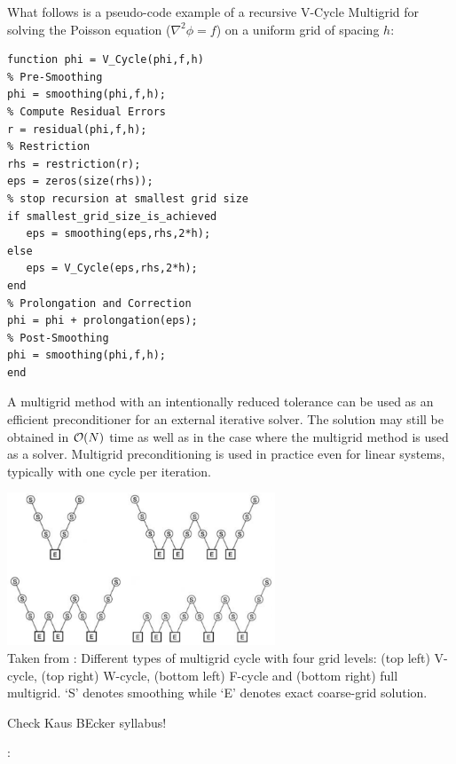 What follows is a pseudo-code example of a recursive V-Cycle Multigrid for solving 
the Poisson equation ($\nabla^2 \phi = f$) 
on a uniform grid of spacing $h$:

\begin{verbatim}
function phi = V_Cycle(phi,f,h)
% Pre-Smoothing
phi = smoothing(phi,f,h);
% Compute Residual Errors
r = residual(phi,f,h);
% Restriction
rhs = restriction(r);
eps = zeros(size(rhs));
% stop recursion at smallest grid size
if smallest_grid_size_is_achieved
   eps = smoothing(eps,rhs,2*h);
else        
   eps = V_Cycle(eps,rhs,2*h);        
end
% Prolongation and Correction
phi = phi + prolongation(eps);
% Post-Smoothing
phi = smoothing(phi,f,h);    
end
\end{verbatim}

A multigrid method with an intentionally reduced tolerance can be used as an efficient preconditioner for an external iterative solver. The solution may still be obtained in ${\cal O}(N)$ time as well as in the case where the multigrid method is used as a solver. Multigrid preconditioning is used in practice even for linear systems, typically with one cycle per iteration.

\begin{center}
\includegraphics[width=8cm]{images/multigrid/cycles}\\
{\scriptsize Taken from \cite{tack10}: Different types of multigrid cycle with four grid levels: (top left) V-cycle, (top right) W-cycle,
(bottom left) F-cycle and (bottom right) full multigrid. ‘S’ denotes smoothing while ‘E’ denotes
exact coarse-grid solution.}
\end{center} 

Check Kaus BEcker syllabus!

\Literature: \cite{tack10,gery10,mabl15,lopp14,tros01,moma05,yaba00,yavn06}
